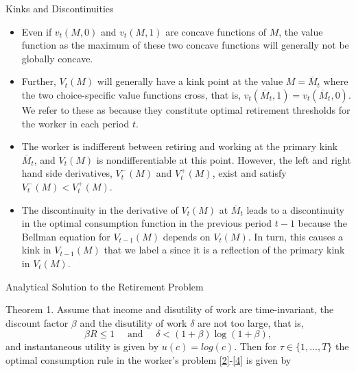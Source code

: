 \documentclass[aspectratio=169]{beamer}
\newcommand{\highlight}[1]{{\color{red}{#1}}}
\begin{document}
\begin{frame}{Kinks and Discontinuities}
	
\begin{itemize}
	\item Even if $v_t(M, 0)$ and $v_t(M, 1)$ are concave functions of $M$, the value function as the maximum of these two concave functions will generally not be globally concave.
	\item Further, $V_t(M)$ will generally have a kink point at the value $M = \overline{M}_t$ where the two choice-specific value functions cross, that is, $v_t(\overline{M}_t, 1) = v_t(\overline{M}_t, 0)$. We refer to these as \highlight{primary kinks}  because they constitute optimal retirement thresholds for the worker in each period $t$. 
	\item The worker is indifferent between retiring and working at the primary kink $\overline{M}_t$, and $V_t(M)$ is nondifferentiable at this point. However, the left and right hand side derivatives, $V_t^{-}(M)$ and $V_t^{+}(M)$, exist and satisfy $V_t^{-}(M) < V_t^{+}(M)$.
	\item The discontinuity in the derivative of $V_t(M)$ at $\overline{M}_t$ leads to a discontinuity in the optimal consumption function in the previous period $t - 1$ because the Bellman equation for $V_{t-1}(M)$ depends on $V_t(M)$. In turn, this causes a kink in $V_{t-1}(M)$ that we label a \highlight{secondary kink} since it is a reflection of the primary kink in $V_t(M)$.
\end{itemize}
	
\end{frame}

\begin{frame}{Analytical Solution to the Retirement Problem}\footnotesize
	
	\begin{theorem} \label{thm1}
		Theorem 1. Assume that income and disutility of work are time-invariant, the discount factor $\beta$ and the disutility of work $\delta$ are not too large, that is, 
		\begin{equation}
			\label{6}
			\beta R \leq 1 \quad \text { and } \quad \delta<(1+\beta) \log (1+\beta),
		\end{equation}
		and instantaneous utility is given by $u(c) = log(c)$. Then for $\tau \in \{1, \ldots, T\}$ the optimal consumption rule in the worker's problem \ref{2}-\ref{4} is given by 
			
	\end{theorem}
\end{frame}
\end{document}
